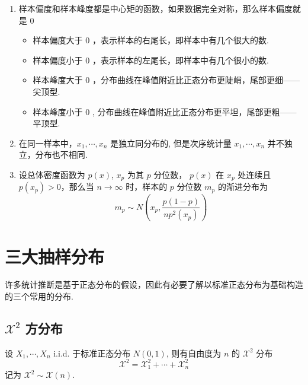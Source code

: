 \documentclass[a5paper,12pt]{article}
\begin{document}
\begin{enumerate}
  \item 样本偏度和样本峰度都是中心矩的函数，如果数据完全对称，那么样本偏度就是 $0$
  \begin{itemize}
    \item 样本偏度大于 $0$ ，表示样本的右尾长，即样本中有几个很大的数.
    \item 样本偏度小于 $0$ ，表示样本的左尾长，即样本中有几个很小的数.
    \item 样本峰度大于 $0$ ，分布曲线在峰值附近比正态分布更陡峭，尾部更细——尖顶型.
    \item 样本峰度小于 $0$ , 分布曲线在峰值附近比正态分布更平坦，尾部更粗——平顶型.
  \end{itemize}
  \item 在同一样本中，$x_1,\cdots,x_n$ 是独立同分布的, 但是次序统计量 $x_{1},\cdots,x_{n}$ 并不独立，分布也不相同.
  \item 设总体密度函数为 $p(x)$, $x_p$ 为其 $p$ 分位数， $p(x)$ 在 $x_p$
  处连续且  $p(x_p)>0$，那么当  $n\to \infty$ 时，样本的 $p$ 分位数 $m_p$
  的渐进分布为
  \[
  m_p \sim N\left( x_p, \frac{p(1-p)}{np^2(x_p)}\right)
  \]
\end{enumerate}



\section{三大抽样分布}
许多统计推断是基于正态分布的假设，因此有必要了解以标准正态分布为基础构造的三个常用的分布.

\subsection{$\mathcal{X}^2$ 方分布}
设 $X_1,\cdots,X_n$ i.i.d. 于标准正态分布  $N(0,1)$, 则有自由度为 $n$ 的 $\mathcal{X}^2$ 分布
\[
\mathcal{X}^2 = \mathcal{X}_1^2+ \cdots +\mathcal{X}_n^2
\]
记为 $\mathcal{X}^2 \sim \mathcal{X}(n)$.
\end{document}
